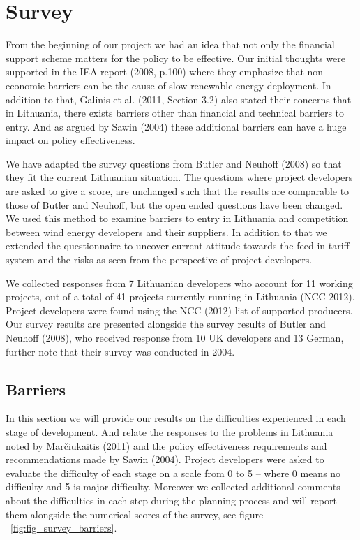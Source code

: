 \documentclass[a4paper, 12pt]{article}
\begin{document}
\section{Survey}
From the beginning of our project we had an idea that not only the financial support scheme matters for the policy to be effective. Our initial thoughts were supported in the IEA report (2008, p.100) where they emphasize that non-economic barriers can be the cause of slow renewable energy deployment. In addition to that, Galinis et al. (2011, Section 3.2) also stated their concerns that in Lithuania, there exists barriers other than financial and technical barriers to entry. And as argued by Sawin (2004) these additional barriers can have a huge impact on policy effectiveness.

We have adapted the survey questions from Butler and Neuhoff (2008) so that they fit the current Lithuanian situation. The questions where project developers are asked to give a score, are unchanged such that the results are comparable to those of Butler and Neuhoff, but the open ended questions have been changed. We used this method to examine barriers to entry in Lithuania and competition between wind energy developers and their suppliers. In addition to that we extended the questionnaire to uncover current attitude towards the feed-in tariff system and the risks as seen from the perspective of project developers.
 
We collected responses from 7 Lithuanian developers who account for 11 working projects, out of a total of 41 projects currently running in Lithuania (NCC 2012). Project developers were found using the NCC (2012) list of supported producers. Our survey results are presented alongside the survey results of Butler and Neuhoff (2008), who received response from 10 UK developers and 13 German, further note that their survey was conducted in 2004.

\subsection{Barriers}
In this section we will provide our results on the difficulties experienced in each stage of development. And relate the responses to the problems in Lithuania noted by Marčiukaitis (2011) and the policy effectiveness requirements and recommendations made by Sawin (2004). Project developers were asked to evaluate the difficulty of each stage on a scale from 0 to 5 – where 0 means no difficulty and 5 is major difficulty. Moreover we collected additional comments about the difficulties in each step during the planning process and will report them alongside the numerical scores of the survey, see figure ~\ref{fig:fig_survey_barriers}.
\end{document}
